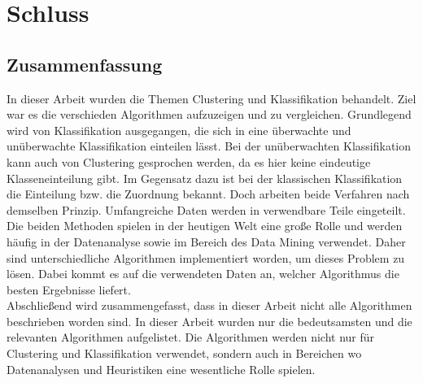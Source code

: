 
\chapter{Schluss}
\section{Zusammenfassung}
In dieser Arbeit wurden die Themen Clustering und Klassifikation behandelt. Ziel war es die verschieden Algorithmen aufzuzeigen und zu vergleichen. Grundlegend wird von Klassifikation ausgegangen, die sich in eine überwachte und unüberwachte Klassifikation einteilen lässt. Bei der unüberwachten Klassifikation kann auch von Clustering gesprochen werden, da es hier keine eindeutige Klasseneinteilung gibt. Im Gegensatz dazu ist bei der klassischen Klassifikation die Einteilung bzw. die Zuordnung bekannt. Doch arbeiten beide Verfahren nach demselben Prinzip. Umfangreiche Daten werden in verwendbare Teile eingeteilt.\\
Die beiden Methoden spielen in der heutigen Welt eine große Rolle und werden häufig in der Datenanalyse sowie im Bereich des Data Mining verwendet. Daher sind unterschiedliche Algorithmen implementiert worden, um dieses Problem zu lösen. Dabei kommt es auf die verwendeten Daten an, welcher Algorithmus die besten Ergebnisse liefert.\\
Abschließend wird zusammengefasst, dass in dieser Arbeit nicht alle Algorithmen beschrieben worden sind. In dieser Arbeit wurden nur die bedeutsamsten und die relevanten Algorithmen aufgelistet. Die Algorithmen werden nicht nur für Clustering und Klassifikation verwendet, sondern auch in Bereichen wo Datenanalysen und Heuristiken eine wesentliche Rolle spielen.

